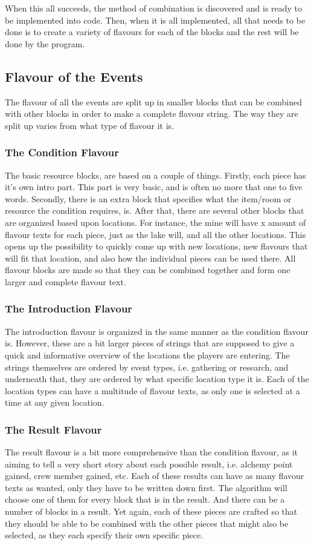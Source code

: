 When this all succeeds, the method of combination is discovered and is ready to be implemented into code. Then, when it is all implemented, all that needs to be done is to create a variety of flavours for each of the blocks and the rest will be done by the program.
\subsection{Flavour of the Events}
\label{sec:flav}

The flavour of all the events are split up in smaller blocks that can be combined with other blocks in order to make a complete flavour string. The way they are split up varies from what type of flavour it is.
\subsubsection{The Condition Flavour}
The basic resource blocks, are based on a couple of things. Firstly, each piece has it's own intro part. This part is very basic, and is often no more that one to five words. Secondly, there is an extra block that specifies what the item/room or resource the condition requires, is. After that, there are several other blocks that are organized based upon locations. For instance, the mine will have x amount of flavour texts for each piece, just as the lake will, and all the other locations. This opens up the possibility to quickly come up with new locations, new flavours that will fit that location, and also how the individual pieces can be used there. All flavour blocks are made so that they can be combined together and form one larger and complete flavour text.
\subsubsection{The Introduction Flavour}
The introduction flavour is organized in the same manner as the condition flavour is. However, these are a bit larger pieces of strings that are supposed to give a quick and informative overview of the locations the players are entering. The strings themselves are ordered by event types, i.e. gathering or research, and underneath that, they are ordered by what specific location type it is. Each of the location types can have a multitude of flavour texts, as only one is selected at a time at any given location.
\subsubsection{The Result Flavour}
The result flavour is a bit more comprehensive than the  condition flavour, as it aiming to tell a very short story about each possible result, i.e. alchemy point gained, crew member gained, etc.
Each of these results can have as many flavour texts as wanted, only they have to be written down first. The algorithm will choose one of them for every block that is in the result. And there can be a number of blocks in a result. Yet again, each of these pieces are crafted so that they should be able to be combined with the other pieces that might also be selected, as they each specify their own specific piece.

